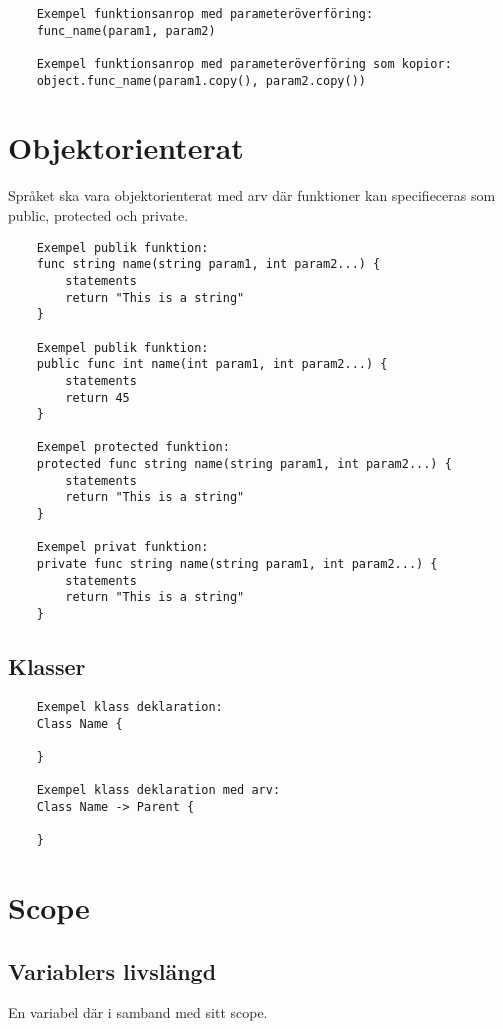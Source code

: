 \documentclass{TDP003mall}
\begin{document}
\begin{verbatim}
    Exempel funktionsanrop med parameteröverföring:
    func_name(param1, param2)

    Exempel funktionsanrop med parameteröverföring som kopior:
    object.func_name(param1.copy(), param2.copy())
\end{verbatim}

    \section{Objektorienterat}
    Språket ska vara objektorienterat med arv där funktioner kan specifieceras som public, protected och private.

    \begin{verbatim}
    Exempel publik funktion:
    func string name(string param1, int param2...) {
        statements
        return "This is a string"
    } 

    Exempel publik funktion: 
    public func int name(int param1, int param2...) { 
        statements
        return 45 
    } 

    Exempel protected funktion: 
    protected func string name(string param1, int param2...) { 
        statements
        return "This is a string"
    } 

    Exempel privat funktion: 
    private func string name(string param1, int param2...) { 
        statements
        return "This is a string"
    } 
\end{verbatim}
    \subsection{Klasser}
        \begin{verbatim}
    Exempel klass deklaration:
    Class Name {
      
    }

    Exempel klass deklaration med arv:
    Class Name -> Parent {
      
    }
\end{verbatim}

    \section{Scope}

    \subsection{Variablers livslängd}
    En variabel där i samband med sitt scope.
 
\end{document}

